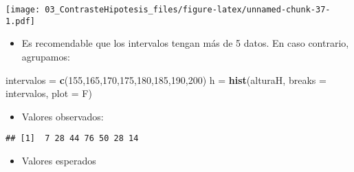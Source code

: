 \documentclass[]{article}
\newenvironment{Shaded}{\begin{snugshade}}{\end{snugshade}}
\newcommand{\KeywordTok}[1]{\textcolor[rgb]{0.13,0.29,0.53}{\textbf{#1}}}
\newcommand{\DataTypeTok}[1]{\textcolor[rgb]{0.13,0.29,0.53}{#1}}
\newcommand{\DecValTok}[1]{\textcolor[rgb]{0.00,0.00,0.81}{#1}}
\newcommand{\StringTok}[1]{\textcolor[rgb]{0.31,0.60,0.02}{#1}}
\newcommand{\OperatorTok}[1]{\textcolor[rgb]{0.81,0.36,0.00}{\textbf{#1}}}
\newcommand{\NormalTok}[1]{#1}
\providecommand{\tightlist}{%
  \setlength{\itemsep}{0pt}\setlength{\parskip}{0pt}}
\begin{document}
\texttt{[image: 03\_ContrasteHipotesis\_files/figure-latex/unnamed-chunk-37-1.pdf]}

\begin{itemize}
\tightlist
\item
  Es recomendable que los intervalos tengan más de 5 datos. En caso
  contrario, agrupamos:
\end{itemize}

\begin{Shaded}
\begin{Highlighting}[]
\NormalTok{intervalos =}\StringTok{ }\KeywordTok{c}\NormalTok{(}\DecValTok{155}\NormalTok{,}\DecValTok{165}\NormalTok{,}\DecValTok{170}\NormalTok{,}\DecValTok{175}\NormalTok{,}\DecValTok{180}\NormalTok{,}\DecValTok{185}\NormalTok{,}\DecValTok{190}\NormalTok{,}\DecValTok{200}\NormalTok{)}
\NormalTok{h =}\StringTok{ }\KeywordTok{hist}\NormalTok{(alturaH, }\DataTypeTok{breaks =}\NormalTok{ intervalos, }\DataTypeTok{plot =}\NormalTok{ F)}
\end{Highlighting}
\end{Shaded}

\begin{itemize}
\tightlist
\item
  Valores observados:
\end{itemize}

\begin{Shaded}
\end{Shaded}

\begin{verbatim}
## [1]  7 28 44 76 50 28 14
\end{verbatim}

\begin{itemize}
\tightlist
\item
  Valores esperados
\end{itemize}
\end{document}
